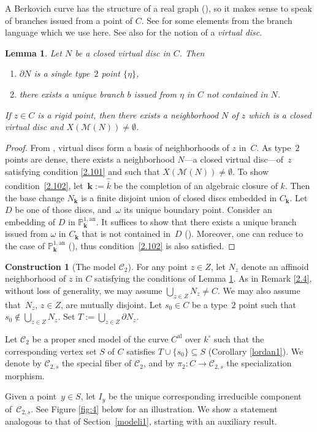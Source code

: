 \documentclass[JEP,XML,SOM,Unicode,NoFloatCountersInSection,published]{cedram}
\newcommand{\al}{\mathrm{al}}
\newcommand{\bbk}{{\boldsymbol{k}}}%
\newtheorem{lm}[thm]{Lemma}
\theoremstyle{definition}
\newtheorem{cons}{Construction}
\begin{document}
A Berkovich curve has the structure of a real graph (\cf \cite[1.3.1]{duc}), so it makes sense to speak of branches issued from a point of $C$. See \cite[1.7]{duc} for some elements from the branch language which we use here. See also \cite[p.\,210]{duc} for the notion of a \emph{virtual disc}.

\begin{lm} \label{2.10}
Let $N$ be a closed virtual disc in $C$. Then
\begin{enumerate}
\item\label{2.101}
$\partial{N}$ is a single type~$2$ point $\{\eta\}$,
\item\label{2.102}
there exists a unique branch $b$ issued from $\eta$ in $C$ not contained in $N$.
\end{enumerate}
If $z \in C$ is a rigid point, then there exists a neighborhood $N$ of $z$ which is a closed virtual disc and $X(\mathscr{M}(N)) \neq \emptyset$.
\end{lm}

\begin{proof}
From \cite[Th.\,4.5.4]{duc}, virtual discs form a basis of neighborhoods of $z$ in~$C$. As type~$2$ points are dense, there exists a neighborhood $N$---a closed virtual disc---of~$z$ satisfying condition \eqref{2.101} and such that $X(\mathscr{M}(N)) \neq \emptyset$. To show condition~\eqref{2.102}, let~$\bbk:=\widehat{\overline{k}}$ be the completion of an algebraic closure of $k$. Then the base change $N_{\bbk}$ is a finite disjoint union of closed discs embedded in $C_{\bbk}$. Let $D$ be one of those discs, and~$\omega$ its unique boundary point. Consider an embedding of $D$ in $\mathbb{P}_{\bbk}^{1, \mathrm{an}}$. It suffices to show that there exists a unique branch issued from $\omega$ in $C_{\bbk}$ that is not contained in~$D$ (\cf \cite[1.7.2]{duc}). Moreover, one can reduce to the case of $\mathbb{P}_{\bbk}^{1, \mathrm{an}}$ (\cf \cite[4.2.11.1]{duc}), thus condition~\eqref{2.102} is also satisfied.
\end{proof}

\begin{cons}[The model $\mathscr{C}_2$] \label{model2} For any point $z \in Z$, let $N_z$ denote an affinoid neighborhood of $z$ in $C$ satisfying the conditions of Lemma \ref{2.10}. As in Remark \ref{2.4}, without loss of generality, we may assume $\bigcup_{z \in Z} N_z\neq C$. We may also assume that~$N_z$, $z \in Z$, are mutually disjoint. Let $s_0 \in C$ be a type~$2$ point such that $s_0 \not \in \bigcup_{z \in Z} N_z$. Set $T:=\bigcup_{{z \in Z}} \partial{N_z}$.

Let $\mathscr{C}_2$ be a proper sncd model of the curve $C^{\al}$ over $k^{\circ}$ such that the corresponding vertex set $S$ of $C$ satisfies $T \cup \{s_0\} \subseteq S$ (\cf Corollary \ref{lordan1}). We denote by $\mathscr{C}_{2,s}$ the special fiber of $\mathscr{C}_2$, and by $\pi_2:C \to \mathscr{C}_{2,s}$ the specialization morphism.
\end{cons}
Given a point~$y \in S$, let $I_y$ be the unique corresponding irreducible component of~$\mathscr{C}_{2,s}$. See Figure \ref{fig:4} below for an illustration. We show a statement analogous to that of Section~\ref{modeli1}, starting with an auxiliary result.
\end{document}

